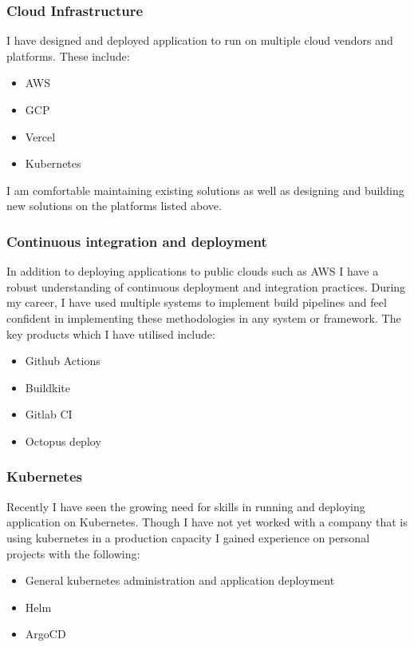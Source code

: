 \documentclass[11pt]{article}
\begin{document}
\subsubsection*{Cloud Infrastructure}
\label{sec:org12c6c9b}

I have designed and deployed application to run on multiple cloud vendors and platforms. These include:

\begin{itemize}
\item AWS
\item GCP
\item Vercel
\item Kubernetes
\end{itemize}

I am comfortable maintaining existing solutions as well as designing and building new solutions on the platforms listed above.
\subsubsection*{Continuous integration and deployment}
\label{sec:org06f5131}

In addition to deploying applications to public clouds such as AWS I have a robust understanding of continuous deployment and integration practices. During my career, I have used multiple systems to implement build pipelines and feel confident in implementing these methodologies in any system or framework. The key products which I have utilised include:

\begin{itemize}
\item Github Actions
\item Buildkite
\item Gitlab CI
\item Octopus deploy
\end{itemize}
\subsubsection*{Kubernetes}
\label{sec:orgdcde56a}

Recently I have seen the growing need for skills in running and deploying application on Kubernetes. Though I have not yet worked with a company that is using kubernetes in a production capacity I gained experience on personal projects with the following:

\begin{itemize}
\item General kubernetes administration and application deployment
\item Helm
\item ArgoCD
\end{itemize}
\end{document}
